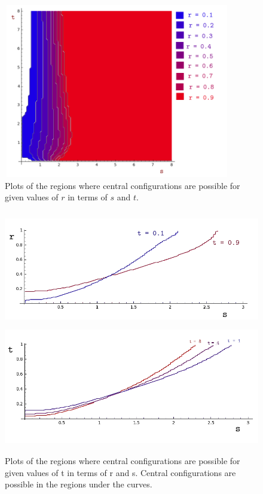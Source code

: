 \documentclass[11pt,leqno]{article}
\theoremstyle{definition}
\theoremstyle{remark}
\numberwithin{equation}{section}
\begin{document}
\begin{center}

\begin{figure}

\includegraphics[width=3.9in, height=3in]{regionsRfixed.png}
 \caption{   Plots of the regions where central configurations are possible for given values of $r$ in terms of $s$ and $t$.} 
\label{rfix}
\end{figure}

\begin{figure}

\includegraphics[width=6in, height=2in]{regionstLessThan1.png}
\includegraphics[width=6in, height=2in]{regionst18.png}
 \caption{   Plots of the regions where central configurations are possible for given values of t in terms of r and s. Central configurations are possible in the regions under the curves.} 
 \label{tfix}
\end{figure}

\end{center}
\end{document}
